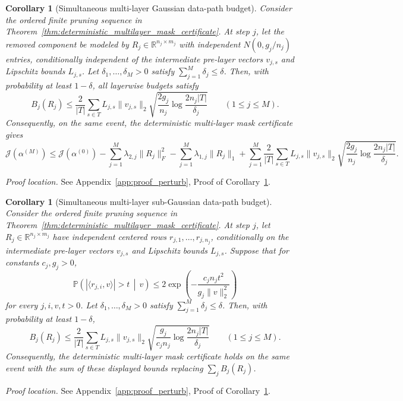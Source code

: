 \documentclass[11pt]{article}
\theoremstyle{plain}
\newtheorem{cor}[thm]{Corollary}
\theoremstyle{definition}
\theoremstyle{remark}
\newcommand{\R}{\mathbb{R}}
\newcommand{\PP}{\mathbb{P}}
\newcommand{\1}{\mathbf{1}}
\newcommand{\proofloc}[1]{\par\noindent\emph{Proof location.} #1\par}
\begin{document}
\begin{cor}[Simultaneous multi-layer Gaussian data-path budget]
\label{cor:multilayer_gaussian_data_path_budget}
Consider the ordered finite pruning sequence in Theorem~\ref{thm:deterministic_multilayer_mask_certificate}. At step \(j\), let the removed component be modeled by \(R_j\in\R^{n_j\times m_j}\) with independent \(N(0,g_j/n_j)\) entries, conditionally independent of the intermediate pre-layer vectors \(v_{j,s}\) and Lipschitz bounds \(L_{j,s}\). Let \(\delta_1,\dots,\delta_M>0\) satisfy \(\sum_{j=1}^M\delta_j\le\delta\). Then, with probability at least \(1-\delta\), all layerwise budgets satisfy
\[
B_j(R_j)
\le
\frac2{|T|}
\sum_{s\in T}
L_{j,s}\|v_{j,s}\|_2
\sqrt{
\frac{2g_j}{n_j}\log\frac{2n_j|T|}{\delta_j}
}
\qquad
(1\le j\le M).
\]
Consequently, on the same event, the deterministic multi-layer mask certificate gives
\[
\mathcal J(\alpha^{(M)})
\le
\mathcal J(\alpha^{(0)})
-
\sum_{j=1}^M\lambda_{2,j}\|R_j\|_F^2
-
\sum_{j=1}^M\lambda_{1,j}\|R_j\|_1
+
\sum_{j=1}^M
\frac2{|T|}
\sum_{s\in T}
L_{j,s}\|v_{j,s}\|_2
\sqrt{
\frac{2g_j}{n_j}\log\frac{2n_j|T|}{\delta_j}
}.
\]
\end{cor}
\proofloc{See Appendix~\ref{app:proof_perturb}, Proof of Corollary~\ref{cor:multilayer_gaussian_data_path_budget}.}

\begin{cor}[Simultaneous multi-layer sub-Gaussian data-path budget]
\label{cor:multilayer_subgaussian_data_path_budget}
Consider the ordered finite pruning sequence in Theorem~\ref{thm:deterministic_multilayer_mask_certificate}. At step \(j\), let \(R_j\in\R^{n_j\times m_j}\) have independent centered rows \(r_{j,1},\dots,r_{j,n_j}\), conditionally on the intermediate pre-layer vectors \(v_{j,s}\) and Lipschitz bounds \(L_{j,s}\). Suppose that for constants \(c_j,g_j>0\),
\[
\PP\!\left(
|\langle r_{j,i},v\rangle|>t\,\middle|\,v
\right)
\le
2\exp\!\left(
-\frac{c_j n_jt^2}{g_j\|v\|_2^2}
\right)
\]
for every \(j,i,v,t>0\). Let \(\delta_1,\dots,\delta_M>0\) satisfy \(\sum_{j=1}^M\delta_j\le\delta\). Then, with probability at least \(1-\delta\),
\[
B_j(R_j)
\le
\frac2{|T|}
\sum_{s\in T}
L_{j,s}\|v_{j,s}\|_2
\sqrt{
\frac{g_j}{c_jn_j}\log\frac{2n_j|T|}{\delta_j}
}
\qquad
(1\le j\le M).
\]
Consequently, the deterministic multi-layer mask certificate holds on the same event with the sum of these displayed bounds replacing \(\sum_jB_j(R_j)\).
\end{cor}
\proofloc{See Appendix~\ref{app:proof_perturb}, Proof of Corollary~\ref{cor:multilayer_subgaussian_data_path_budget}.}
\end{document}
